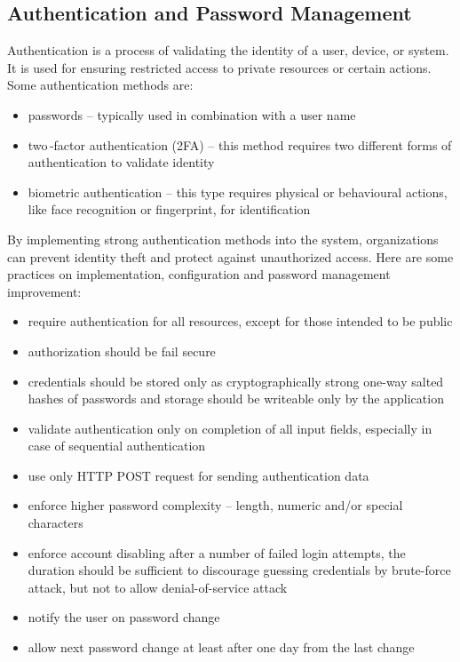   \subsection*{Authentication and Password Management}
    Authentication is a process of validating the identity of a user, device, or system. It is used for
    ensuring restricted access to private resources or certain actions. Some authentication methods
    are:
    \begin{itemize}
      \item passwords -- typically used in combination with a user name
      \item two\,-factor authentication (2FA) -- this method requires two different forms of authentication
            to validate identity
      \item biometric authentication -- this type requires physical or behavioural actions, like
            face recognition or fingerprint, for identification
    \end{itemize}
    By implementing strong authentication methods into the system, organizations can prevent identity theft
    and protect against unauthorized access. Here are some practices on implementation, configuration
    and password management improvement:
    \begin{itemize}
      \item require authentication for all resources, except for those intended to be public
      \item authorization should be fail secure
      \item credentials should be stored only as cryptographically strong one-way salted hashes of passwords
            and storage should be writeable only by the application
      \item validate authentication only on completion of all input fields, especially in case of sequential
            authentication
      \item use only HTTP POST request for sending authentication data
      \item enforce higher password complexity -- length, numeric and/or special characters
      \item enforce account disabling after a number of failed login attempts, the duration should
            be sufficient to discourage guessing credentials by brute-force attack, but not to allow
            denial-of-service attack
      \item notify the user on password change
      \item allow next password change at least after one day from the last change
    \end{itemize}

